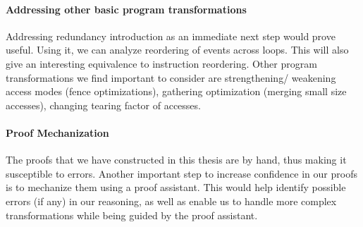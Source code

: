     \paragraph{Addressing other basic program transformations}
        Addressing redundancy introduction as an immediate next step would prove useful.
        Using it, we can analyze reordering of events across loops. 
        This will also give an interesting equivalence to instruction reordering. 
        Other program transformations we find important to consider are strengthening/ weakening access modes (fence optimizations), gathering optimization (merging small size accesses), changing tearing factor of accesses. 

    \paragraph{Proof Mechanization}
        The proofs that we have constructed in this thesis are by hand, thus making it susceptible to errors.
        Another important step to increase confidence in our proofs is to mechanize them using a proof assistant.
        This would help identify possible errors (if any) in our reasoning, as well as enable us to handle more complex transformations while being guided by the proof assistant. 
